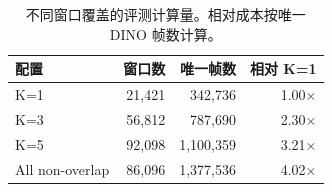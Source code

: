 \begin{table}[!t]
  \centering
  \caption{不同窗口覆盖的评测计算量。相对成本按唯一 DINO 帧数计算。}
  \label{tab:u0_compute_cost}
  \begin{tabular}{lrrr}
    \toprule
    配置 & 窗口数 & 唯一帧数 & 相对 K=1 \\
    \midrule
    K=1 & 21,421 & 342,736 & 1.00$\times$ \\
    K=3 & 56,812 & 787,690 & 2.30$\times$ \\
    K=5 & 92,098 & 1,100,359 & 3.21$\times$ \\
    All non-overlap & 86,096 & 1,377,536 & 4.02$\times$ \\
    \bottomrule
  \end{tabular}
\end{table}

